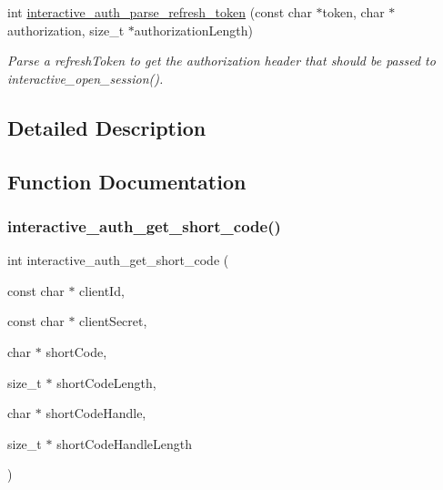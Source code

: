 \begin{DoxyCompactItemize}
\begin{DoxyCompactList}
{\ttfamily  }\end{DoxyCompactList}\item 
int \mbox{\hyperlink{group__interactivity_gaebcb6d12678db4826f74b36bf3cb9763}{interactive\+\_\+auth\+\_\+parse\+\_\+refresh\+\_\+token}} (const char $\ast$token, char $\ast$authorization, size\+\_\+t $\ast$authorization\+Length)
\begin{DoxyCompactList}\small\item\em Parse a {\ttfamily refresh\+Token} to get the authorization header that should be passed to {\ttfamily interactive\+\_\+open\+\_\+session()}. \end{DoxyCompactList}\end{DoxyCompactItemize}


\subsection{Detailed Description}


\subsection{Function Documentation}
\mbox{\label{group__interactivity_ga933fa6f40b4d9728b20286badcf0b4f5}} 
\subsubsection{\texorpdfstring{interactive\+\_\+auth\+\_\+get\+\_\+short\+\_\+code()}{interactive\_auth\_get\_short\_code()}}
{\footnotesize\ttfamily int interactive\+\_\+auth\+\_\+get\+\_\+short\+\_\+code (\begin{DoxyParamCaption}\item[{const char $\ast$}]{client\+Id,  }\item[{const char $\ast$}]{client\+Secret,  }\item[{char $\ast$}]{short\+Code,  }\item[{size\+\_\+t $\ast$}]{short\+Code\+Length,  }\item[{char $\ast$}]{short\+Code\+Handle,  }\item[{size\+\_\+t $\ast$}]{short\+Code\+Handle\+Length }\end{DoxyParamCaption})}



